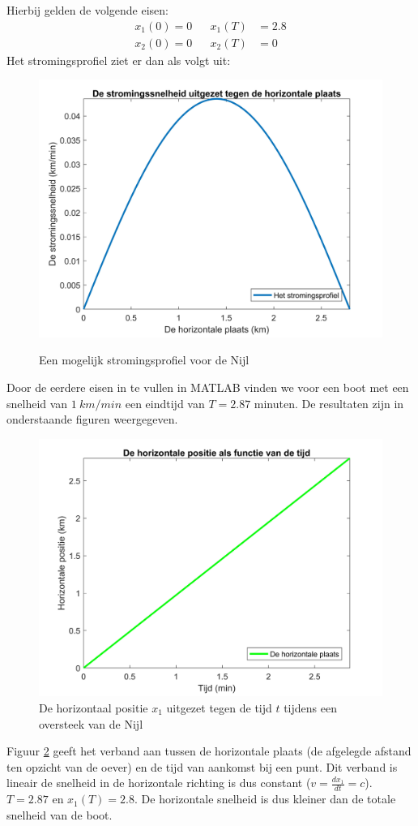Hierbij gelden de volgende eisen:
\begin{align*}
	x_1(0) = 0 && x_1(T) &= 2.8\\
	x_2(0) = 0&& x_2(T) &= 0
\end{align*}
Het stromingsprofiel ziet er dan als volgt uit:
\begin{figure}[H]
\centering
	\includegraphics[width=\linewidth]{Sin_stroming_4.jpg}\label{fig:sinstroom}
	\caption{Een mogelijk stromingsprofiel voor de Nijl}
\end{figure}

Door de eerdere eisen in te vullen in MATLAB vinden we voor een boot met een snelheid van \(1~km/min\) een eindtijd van \(T=2.87\) minuten. De resultaten zijn in onderstaande figuren weergegeven.\\
\begin{figure}[H]
	\centering
	\includegraphics[width=\textwidth]{Sin_xt_3.jpg}
	\caption{De horizontaal positie \(x_1\) uitgezet tegen de tijd \(t\) tijdens een oversteek van de Nijl}\label{fig:sinplots1}
\end{figure}
Figuur \ref{fig:sinplots1} geeft het verband aan tussen de horizontale plaats (de afgelegde afstand ten opzicht van de oever) en de tijd van aankomst bij een punt.
Dit verband is lineair de snelheid in de horizontale richting is dus constant (\(v=\frac{dx_1}{dt}=c\)). \(T=2.87\) en \(x_1(T)=2.8\).
De horizontale snelheid is dus kleiner dan de totale snelheid van de boot.


